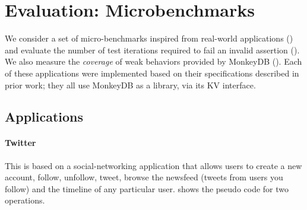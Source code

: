 
\section{Evaluation: Microbenchmarks}
\label{sec:micro}

We consider a set of micro-benchmarks inspired from real-world applications 
() and evaluate the number of test iterations
required to fail an invalid assertion 
(). We also measure the \textit{coverage} of
weak behaviors provided by MonkeyDB (). Each of these
applications were implemented based on their specifications described in prior
work; they all use MonkeyDB as a library, via its KV interface.  


\subsection{Applications}
\label{sec:micro-benchmarks}

\paragraph{Twitter \cite{twissandra}}
This is based on a social-networking application that allows users to create a new account, follow,
unfollow, tweet, browse the newsfeed (tweets from users you follow)
and the timeline of any particular user. 
 shows the pseudo code for two operations. 

